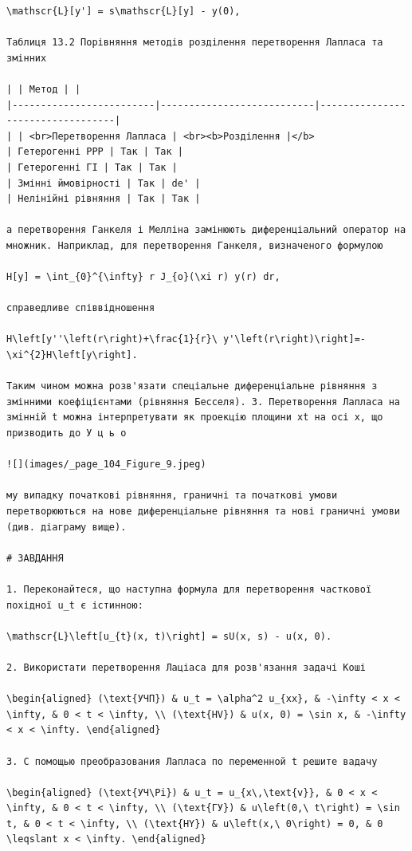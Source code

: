 \documentclass[
  ukrainian,
]{article}
\begin{document}
\begin{verbatim}
\mathscr{L}[y'] = s\mathscr{L}[y] - y(0),

Таблиця 13.2 Порівняння методів розділення перетворення Лапласа та змінних

| | Метод | |
|-------------------------|---------------------------|----------------------------------|
| | <br>Перетворення Лапласа | <br><b>Розділення |</b>
| Гетерогенні PPP | Так | Так |
| Гетерогенні ГІ | Так | Так |
| Змінні ймовірності | Так | de' |
| Нелінійні рівняння | Так | Так |

а перетворення Ганкеля і Мелліна замінюють диференціальний оператор на множник. Наприклад, для перетворення Ганкеля, визначеного формулою

H[y] = \int_{0}^{\infty} r J_{o}(\xi r) y(r) dr,

справедливе співвідношення

H\left[y''\left(r\right)+\frac{1}{r}\ y'\left(r\right)\right]=-\xi^{2}H\left[y\right].

Таким чином можна розв'язати спеціальне диференціальне рівняння з змінними коефіцієнтами (рівняння Бесселя). 3. Перетворення Лапласа на змінній t можна інтерпретувати як проекцію площини xt на осі x, що призводить до У ц ь о

![](images/_page_104_Figure_9.jpeg)

му випадку початкові рівняння, граничні та початкові умови перетворюються на нове диференціальне рівняння та нові граничні умови (див. діаграму вище).

# ЗАВДАННЯ

1. Переконайтеся, що наступна формула для перетворення часткової похідної u_t є істинною:

\mathscr{L}\left[u_{t}(x, t)\right] = sU(x, s) - u(x, 0).

2. Використати перетворення Лаціаса для розв'язання задачі Коші

\begin{aligned} (\text{УЧП}) & u_t = \alpha^2 u_{xx}, & -\infty < x < \infty, & 0 < t < \infty, \\ (\text{HV}) & u(x, 0) = \sin x, & -\infty < x < \infty. \end{aligned}

3. С помощью преобразования Лапласа по переменной t решите вадачу

\begin{aligned} (\text{УЧ\Pi}) & u_t = u_{x\,\text{v}}, & 0 < x < \infty, & 0 < t < \infty, \\ (\text{ГУ}) & u\left(0,\ t\right) = \sin t, & 0 < t < \infty, \\ (\text{HY}) & u\left(x,\ 0\right) = 0, & 0 \leqslant x < \infty. \end{aligned}


\end{verbatim}
\end{document}
